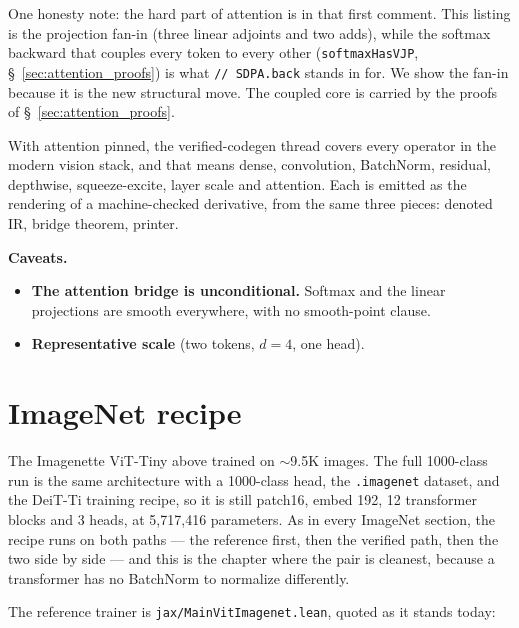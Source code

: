 \medskip\noindent One honesty note: the hard part of attention is in that
first comment. This listing is the projection fan-in (three linear
adjoints and two adds), while the softmax backward that couples every token
to every other (\texttt{softmaxHasVJP}, \S~\ref{sec:attention_proofs}) is
what \texttt{// SDPA.back} stands in for. We show the fan-in because it is the
new structural move. The coupled core is carried by the proofs of
\S~\ref{sec:attention_proofs}.

\medskip\noindent With attention pinned, the verified-codegen thread covers
every operator in the modern vision stack, and that means dense, convolution,
BatchNorm, residual, depthwise, squeeze-excite, layer scale and attention.
Each is emitted as the rendering of a machine-checked derivative, from the
same three pieces: denoted IR, bridge theorem, printer.

\medskip\noindent\textbf{Caveats.}
\begin{itemize}
  \item \textbf{The attention bridge is unconditional.} Softmax and the
    linear projections are smooth everywhere, with no smooth-point clause.
  \item \textbf{Representative scale} (two tokens, $d = 4$, one head).
\end{itemize}

\section{ImageNet recipe}
\label{sec:vit_imagenet}

The Imagenette ViT-Tiny above trained on $\sim$9.5K images. The full
1000-class run is the same architecture with a 1000-class head, the
\texttt{.imagenet} dataset, and the DeiT-Ti training recipe, so it is
still patch16, embed 192, 12 transformer blocks and 3 heads, at
5{,}717{,}416 parameters. As in every ImageNet section, the recipe runs
on both paths --- the reference first, then the verified path, then the
two side by side --- and this is the chapter where the pair is cleanest,
because a transformer has no BatchNorm to normalize differently.


The reference trainer is \texttt{jax/MainVitImagenet.lean}, quoted as it
stands today:

